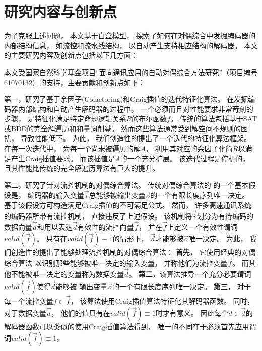 \section{研究内容与创新点}\label{sec_contest_innov}
为了克服上述问题，
本文基于白盒模型，
探索了如何在对偶综合中发掘编码器的内部结构信息，
如流控和流水线结构，
以自动产生支持相应结构的解码器。
本文的主要研究内容及创新点包括以下几方面：

本文受国家自然科学基金项目“面向通讯应用的自动对偶综合方法研究”（项目编号61070132）的支持，主要贡献和创新点如下：



第一，研究了基于余因子(Cofactoring)和Craig插值的迭代特征化算法。
在发掘编码器内部结构和自动产生解码器的过程中，
一个必须而且对性能要求非常苛刻的步骤，
是特征化满足特定命题逻辑关系$R$的布尔函数$f$。
传统的算法包括基于SAT或BDD的完全解遍历和和量词削减。
然而这些算法通常受到解空间不规则的困扰，
导致性能低下。
为此，
我们创造性的提出了一个迭代的特征化算法框架。
在每一次迭代中，
为每一个尚未被遍历的解$A$，
利用其对应的余因子化简$R$以满足产生Craig插值要求。
而该插值是$A$的一个充分扩展。
该迭代过程是停机的，
且其性能比传统的完全解遍历算法有巨大的提升。

第二，研究了针对流控机制的对偶综合算法。
传统对偶综合算法的 的一个基本假设是，
编码器的输入变量$\vec{i}$总能够被输出变量$\vec{o}$的一个有限长度序列唯一决定。
基于该假设方可构造满足Craig插值的不可满足公式。
然而，
许多高速通讯系统的编码器所带有流控机制，
直接违反了上述假设。
该机制将$\vec{i}$划分为有待编码的数据向量$\vec{d}$和用以表达$\vec{d}$有效性的流控向量$\vec{f}$，
并在$\vec{f}$上定义一个有效性谓词$valid(\vec{f})$。
只有在$valid(\vec{f})\equiv 1$的情形下，
$\vec{d}$才能够被$\vec{o}$唯一决定。
为此，
我们创造性的提出了能够处理流控机制的对偶综合算法：
\textbf{首先}，
它使用经典的对偶综合算法
以识别那些能够被唯一决定的输入变量，
并称他们为流控变量$\vec{f}$。
而其他不能被唯一决定的变量称为数据变量$\vec{d}$。
\textbf{第二}，该算法推导一个充分必要谓词$valid(\vec{f})$使得$\vec{d}$能够被
输出变量$\vec{o}$的一个有限长度序列唯一决定。
\textbf{第三}，
对于每一个流控变量$f\in\vec{f}$，
该算法使用Craig插值算法特征化其解码器函数。
同时，
对于数据变量$\vec{d}$，
他们的值只有在$valid(\vec{f}) \equiv 1$时才有意义。
因此每个$d\in\vec{d}$的解码器函数可以类似的使用Craig插值算法得到，
唯一的不同在于必须首先应用谓词$valid(\vec{f}) \equiv 1$。



